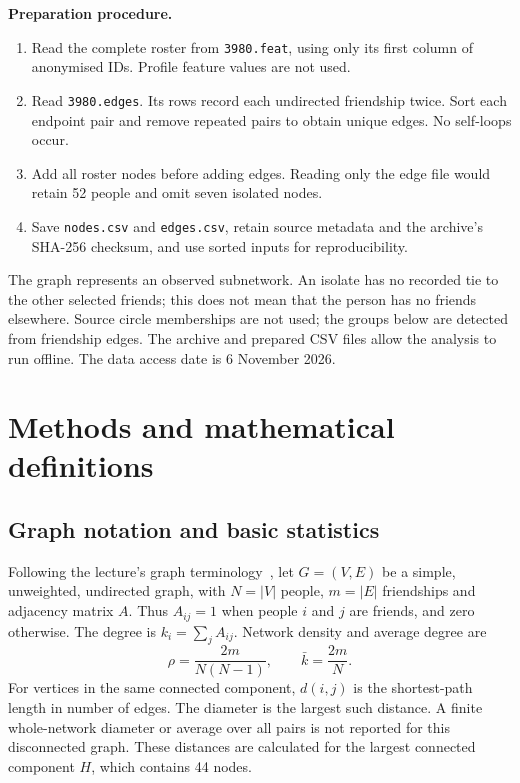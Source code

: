\documentclass[11pt,a4paper]{article}
\begin{document}
\textbf{Preparation procedure.}
\begin{enumerate}
\item Read the complete roster from \texttt{3980.feat}, using only its first
column of anonymised IDs. Profile feature values are not used.
\item Read \texttt{3980.edges}. Its \Rawrows{} rows record each undirected
friendship twice. Sort each endpoint pair and remove repeated pairs to obtain
\Nedges{} unique edges. No self-loops occur.
\item Add all \Nnodes{} roster nodes before adding edges. Reading only the edge
file would retain 52 people and omit seven isolated nodes.
\item Save \texttt{nodes.csv} and \texttt{edges.csv}, retain source metadata and
the archive's SHA-256 checksum, and use sorted inputs for reproducibility.
\end{enumerate}

The graph represents an observed subnetwork. An isolate has no recorded tie to
the other selected friends; this does not mean that the person has no friends
elsewhere. Source circle memberships are not used; the groups below are detected
from friendship edges. The archive and prepared CSV files allow the analysis to run offline.
The data access date is 6 November 2026.

\clearpage
\section{Methods and mathematical definitions}
\subsection{Graph notation and basic statistics}
Following the lecture's graph terminology~\cite{lecture}, let $G=(V,E)$ be a
simple, unweighted, undirected graph, with $N=|V|$ people,
$m=|E|$ friendships and adjacency matrix $A$. Thus $A_{ij}=1$ when people $i$
and $j$ are friends, and zero otherwise. The degree is $k_i=\sum_j A_{ij}$.
Network density and average degree are
\begin{equation}
\rho=\frac{2m}{N(N-1)},\qquad \bar{k}=\frac{2m}{N}.
\end{equation}
For vertices in the same connected component, $d(i,j)$ is the shortest-path
length in number of edges. The diameter is the largest such distance. A finite
whole-network diameter or average over all pairs is not reported for this
disconnected graph. These distances are calculated for the largest connected
component $H$, which contains 44 nodes.
\end{document}
